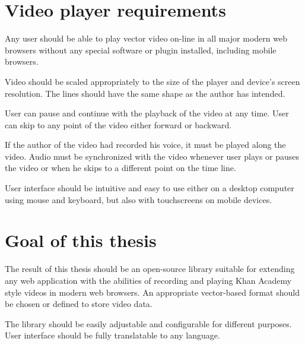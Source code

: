 \section{Video player requirements}
Any user should be able to play vector video on-line in all major modern web browsers without any special software or plugin installed, including mobile browsers.

Video should be scaled appropriately to the size of the player and device's screen resolution. The lines should have the same shape as the author has intended.

User can pause and continue with the playback of the video at any time. User can skip to any point of the video either forward or backward.

If the author of the video had recorded his voice, it must be played along the video. Audio must be synchronized with the video whenever user plays or pauses the video or when he skips to a different point on the time line.

User interface should be intuitive and easy to use either on a desktop computer using mouse and keyboard, but also with touchscreens on mobile devices.

\section{Goal of this thesis}

The result of this thesis should be an open-source library suitable for extending any web application with the abilities of recording and playing Khan Academy style videos in modern web browsers. An appropriate vector-based format should be chosen or defined to store video data.

The library should be easily adjustable and configurable for different purposes. User interface should be fully translatable to any language.